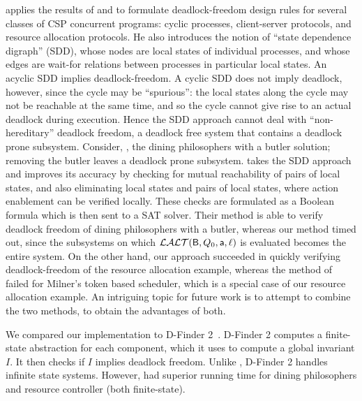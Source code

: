  applies the results of  and  to formulate deadlock-freedom design rules for several classes of CSP concurrent
programs: cyclic processes, client-server protocols, and resource allocation protocols. He also introduces the notion of ``state dependence digraph''
(SDD), whose nodes are local states of individual processes, and whose edges are wait-for relations between processes in particular local states. An
acyclic SDD implies deadlock-freedom. A cyclic SDD does not imply deadlock, however, since the cycle may be ``spurious'': the local states along the
cycle may not be reachable at the same time, and so the cycle cannot give rise to an actual deadlock during execution. Hence the SDD approach cannot
deal with ``non-hereditary'' deadlock freedom, \ie a deadlock free system that contains a deadlock prone subsystem. Consider, \eg, the dining
philosophers with a butler solution; removing the butler leaves a deadlock prone subsystem.
%
takes the SDD approach and improves its accuracy by checking for mutual reachability of pairs of local states, and also
eliminating local states and pairs of local states, where action enablement can be verified locally.
These checks are formulated as a Boolean formula which is then sent to
a SAT solver. Their method is able to verify deadlock freedom of
dining philosophers with a butler, whereas our method timed out, %
since the subsystems on which $\mathcal{LALT}(\mathsf{B}, Q_0, \mathsf{a}, \ell)$ is evaluated becomes the entire system.
On the other hand, our approach succeeded in quickly verifying deadlock-freedom of the resource
allocation example, whereas the method of 
failed for Milner's token based scheduler, which is a special
case of our resource allocation example.
%
An intriguing topic for future work is to attempt to combine the two methods, to obtain the
advantages of both.



We compared our implementation \deadlocktool to D-Finder 2~\cite{DFinder2}. 
D-Finder 2 computes a finite-state abstraction for each component, which it uses
to compute a global invariant $I$. It then checks if $I$ 
implies deadlock freedom.  Unlike \deadlocktool, D-Finder 2 
handles infinite state systems.
However, \deadlocktool had superior running time for
dining philosophers and resource controller (both finite-state).

